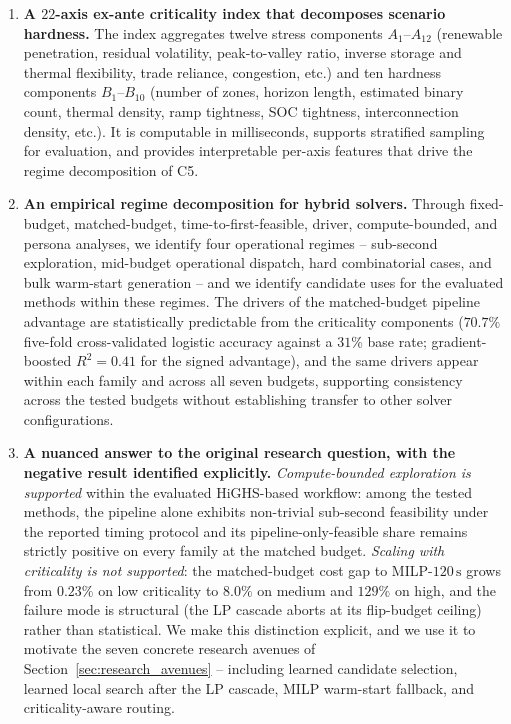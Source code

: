 \documentclass{article}
\begin{document}
\begin{enumerate}[label=\textbf{C\arabic*}, leftmargin=*, itemsep=3pt]
  \item \textbf{A $22$-axis ex-ante criticality index that decomposes scenario hardness.} The index aggregates twelve stress components $A_1$--$A_{12}$ (renewable penetration, residual volatility, peak-to-valley ratio, inverse storage and thermal flexibility, trade reliance, congestion, etc.) and ten hardness components $B_1$--$B_{10}$ (number of zones, horizon length, estimated binary count, thermal density, ramp tightness, SOC tightness, interconnection density, etc.). It is computable in milliseconds, supports stratified sampling for evaluation, and provides interpretable per-axis features that drive the regime decomposition of C5.

  \item \textbf{An empirical regime decomposition for hybrid solvers.} Through fixed-budget, matched-budget, time-to-first-feasible, driver, compute-bounded, and persona analyses, we identify four operational regimes -- sub-second exploration, mid-budget operational dispatch, hard combinatorial cases, and bulk warm-start generation -- and we identify candidate uses for the evaluated methods within these regimes. The drivers of the matched-budget pipeline advantage are statistically predictable from the criticality components ($70.7\%$ five-fold cross-validated logistic accuracy against a $31\%$ base rate; gradient-boosted $R^2 = 0.41$ for the signed advantage), and the same drivers appear within each family and across all seven budgets, supporting consistency across the tested budgets without establishing transfer to other solver configurations.

  \item \textbf{A nuanced answer to the original research question, with the negative result identified explicitly.} \emph{Compute-bounded exploration is supported} within the evaluated HiGHS-based workflow: among the tested methods, the pipeline alone exhibits non-trivial sub-second feasibility under the reported timing protocol and its pipeline-only-feasible share remains strictly positive on every family at the matched budget. \emph{Scaling with criticality is not supported}: the matched-budget cost gap to MILP-$120\,\mathrm{s}$ grows from $0.23\%$ on low criticality to $8.0\%$ on medium and $129\%$ on high, and the failure mode is structural (the LP cascade aborts at its flip-budget ceiling) rather than statistical. We make this distinction explicit, and we use it to motivate the seven concrete research avenues of Section~\ref{sec:research_avenues} -- including learned candidate selection, learned local search after the LP cascade, MILP warm-start fallback, and criticality-aware routing.

\end{enumerate}
\end{document}
